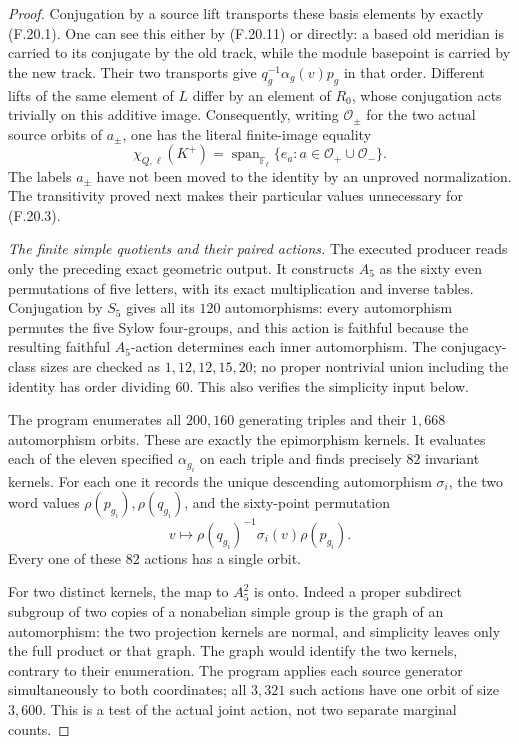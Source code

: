 \begin{proof}
Conjugation by a source lift transports these basis
elements by exactly (F.20.1).
One can see this either by (F.20.11) or directly:
a based old meridian is carried to its conjugate
by the old track, while the module basepoint is
carried by the new track. Their two transports
give $q_g^{-1}\alpha_g(v)p_g$ in that order.
Different lifts of the same element of $L$ differ
by an element of $R_0$, whose conjugation acts
trivially on this additive image.
Consequently, writing $\mathcal O_\pm$ for the
two actual source orbits of $a_\pm$, one has the
literal finite-image equality
\[
 \chi_{Q,\ell}(K^+)
       =\operatorname{span}_{\mathbb F_\ell}
                  \{e_a:a\in\mathcal O_+\cup\mathcal O_-\}.
                                                               \tag{F.20.16}
\]
The labels $a_\pm$ have not been moved to the
identity by an unproved normalization.
The transitivity proved next makes their particular
values unnecessary for (F.20.3).

\emph{The finite simple quotients and their paired actions.}
The executed producer
reads only the preceding exact geometric output.
It constructs $A_5$ as the sixty even permutations
of five letters, with its exact multiplication
and inverse tables. Conjugation by $S_5$ gives
all its $120$ automorphisms: every automorphism
permutes the five Sylow four-groups, and this
action is faithful because the resulting faithful
$A_5$-action determines each inner automorphism.
The conjugacy-class sizes are checked as
$1,12,12,15,20$; no proper nontrivial union
including the identity has order dividing $60$.
This also verifies the simplicity input below.

The program enumerates all $200,160$ generating
triples and their $1,668$ automorphism orbits.
These are exactly the epimorphism kernels.
It evaluates each of the eleven specified
$\alpha_{g_i}$ on each triple and finds precisely
$82$ invariant kernels. For each one it records
the unique descending automorphism $\sigma_i$,
the two word values $\rho(p_{g_i}),\rho(q_{g_i})$,
and the sixty-point permutation
\[
       v\longmapsto
       \rho(q_{g_i})^{-1}\sigma_i(v)\rho(p_{g_i}).
                                                               \tag{F.20.17}
\]
Every one of these $82$ actions has a single orbit.

For two distinct kernels, the map to $A_5^2$
is onto. Indeed a proper subdirect subgroup of
two copies of a nonabelian simple group is the
graph of an automorphism: the two projection
kernels are normal, and simplicity leaves
only the full product or that graph.
The graph would identify the two kernels,
contrary to their enumeration.
The program applies each source generator
simultaneously to both coordinates; all
$3,321$ such actions have one orbit of size
$3,600$. This is a test of the actual joint
action, not two separate marginal counts.


\end{proof}
